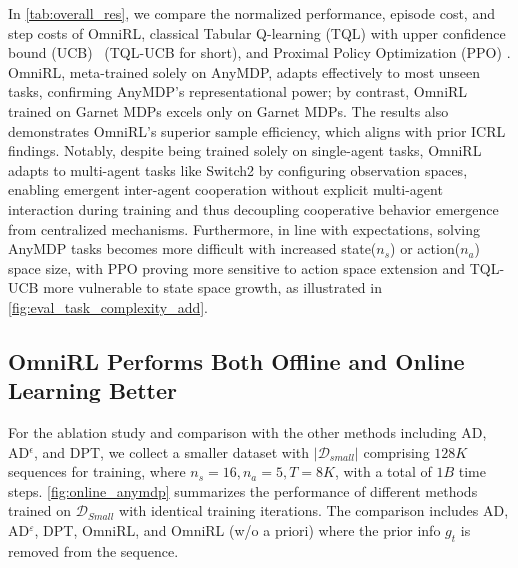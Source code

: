 \documentclass{article}
\renewcommand{\cite}[1]{\citep{#1}}
\begin{document}
In \cref{tab:overall_res}, we compare the normalized performance, episode cost, and step costs of OmniRL, classical Tabular Q-learning (TQL) \cite{sutton1998reinforcement} with upper confidence bound (UCB)~\cite{jin2018q} (TQL-UCB for short), and Proximal Policy Optimization (PPO) \citep{schulman2017proximal}. OmniRL, meta-trained solely on AnyMDP, adapts effectively to most unseen tasks, confirming AnyMDP’s representational power; by contrast, OmniRL trained on Garnet MDPs excels only on Garnet MDPs. The results also demonstrates OmniRL's superior sample efficiency, which aligns with prior ICRL findings. Notably, despite being trained solely on single-agent tasks, OmniRL adapts to multi-agent tasks like Switch2 by configuring observation spaces, enabling emergent inter-agent cooperation without explicit multi-agent interaction during training and thus decoupling cooperative behavior emergence from centralized mechanisms. Furthermore, in line with expectations, solving AnyMDP tasks becomes more difficult with increased state($n_s$) or action($n_a$) space size, with PPO proving more sensitive to action space extension and TQL-UCB more vulnerable to state space growth, as illustrated in \cref{fig:eval_task_complexity_add}.


\subsection{OmniRL Performs Both Offline and Online Learning Better}\label{sec:results_base}
For the ablation study and comparison with the other methods including AD, AD$^\epsilon$, and DPT, we collect a smaller dataset with $|\mathcal{D}_{small}|$ comprising $128K$ sequences for training, where $n_s=16, n_a=5, T=8K$, with a total of $1B$ time steps. \cref{fig:online_anymdp} summarizes the performance of different methods trained on $\mathcal{D}_{Small}$ with identical training iterations. The comparison includes AD, AD$^{\varepsilon}$, DPT, OmniRL, and OmniRL (w/o a priori) where the prior info $g_t$ is removed from the sequence. 
\end{document}
